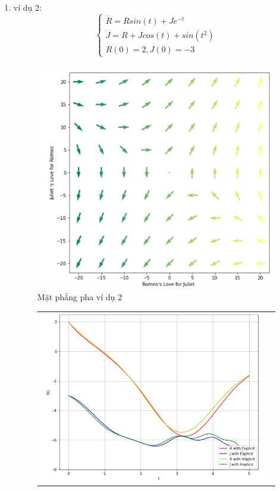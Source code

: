 \documentclass[a4paper]{article}
\begin{document}
\begin{enumerate}
\begin{enumerate}
\begin{figure}[htp]
\end{figure}
$\indent$ Các đường màu đỏ, xanh dương, vàng và xanh lá cây lần lượt là R theo phương pháp Explicit, J theo phương pháp Explicit, R theo phương pháp Implicit và J theo phương pháp Implicit
    \item ví dụ 2:
    \begin{equation} \label{ex:vd2}
        \begin{cases}
            \dot{R}= Rsin(t) + Je^{-t} \\
            \dot{J} = R+Jcos(t) + sin(t^2) \\
            R(0) = 2, J(0) = -3
        \end{cases}
    \end{equation}
    \begin{figure}[htp]
    \centering
    \includegraphics[scale = .8]{Images/Bt4/vd2/field.png}
    \caption{Mặt phẳng pha ví dụ 2}
\end{figure} 
\newpage
\begin{figure}[htp] 
    \begin{tabular}{cc}
        \includegraphics[scale=.58]{Images/Bt4/vd2/h=0,1.png} &

\end{tabular}
\end{figure}
\end{enumerate}
\end{enumerate}
\end{document}
